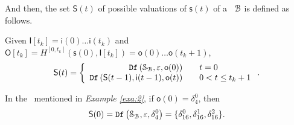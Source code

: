  And then, the set $\mathsf{S}(t)$ of possible valuations of $\mathsf{s}(t)$ of a \BCN\ ${\mathcal{B}}$ is defined as follows. 
 \begin{definition}[$\mathsf{S}(t)$] Given $\mathsf{I}[t_k]=\mathsf{i}(0)\ldots\mathsf{i}(t_k)$ and $\mathsf{O}[t_k]= H^{[0,t_k]}(\mathsf{s}(0),\mathsf{I}[t_k])=\mathsf{o}(0)\ldots\mathsf{o}(t_k+1)$, %
	\[\mathsf{S}(t)=\left\{
\begin{array}{rcl}
{\tt Df}\left(\mathcal{S}_{\mathcal{B}},\varepsilon,\mathsf{o}(0)\right)      &      & {t=0}\\
{\tt Df}\left(\mathsf{S}(t-1),\mathsf{i}(t-1),\mathsf{o}(t)\right)       &      & 0<t\leq t_k+1
\end{array} \right. .\]

\end{definition}
\begin{example}
In the \BCN\ mentioned in {\em Example \ref{exa:2}}, if $\mathsf{o}(0)=\delta_4^0$, then \[\mathsf{S}(0)={\tt Df}\left(\mathcal{S}_{\mathcal{B}},\varepsilon,\delta_4^0\right)=\{\delta_{16}^0,\delta_{16}^1,\delta_{16}^2\}.\]
 \label{exa:8}
 \end{example}   
 

 
 

